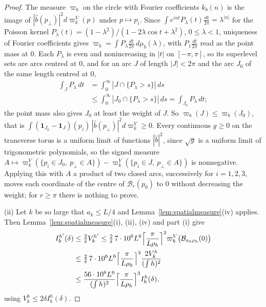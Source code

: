 \documentclass[aps,prd,twocolumn,superscriptaddress,nofootinbib,longbibliography,floatfix,amsmath,amssymb,10pt]{revtex4-2}
\theoremstyle{definition}
\theoremstyle{remark}
\begin{document}
\begin{proof}
The measure $\varpi_b$ on the circle with Fourier coefficients $k_b(n)$ is
the image of $|\hat b(p_\perp)|^2d\varpi^V_k(p)$ under $p\mapsto p_i$.
Since $\int e^{int}P_\lambda(t)\frac{dt}{2\pi}=\lambda^{|n|}$ for the Poisson
kernel $P_\lambda(t)=(1-\lambda^2)/(1-2\lambda\cos t+\lambda^2)$, $0\le
\lambda<1$, uniqueness of Fourier coefficients gives $\varpi_b=\int
P_\lambda\frac{dt}{2\pi}\,d\mu_b(\lambda)$, with $P_1\frac{dt}{2\pi}$ read
as the point mass at $0$. Each $P_\lambda$ is even and nonincreasing in
$|t|$ on $[-\pi,\pi]$, so its superlevel sets are arcs centred at $0$, and
for an arc $J$ of length $|J|<2\pi$ and the arc $J_0$ of the same length
centred at $0$,
\[
\begin{split}
\int_JP_\lambda\,dt&=\int_0^\infty|J\cap\{P_\lambda>s\}|\,ds\\
&\le\int_0^\infty|J_0\cap\{P_\lambda>s\}|\,ds=\int_{J_0}P_\lambda\,dt ;
\end{split}
\]
the point mass also gives $J_0$ at least the weight of $J$. So
$\varpi_b(J)\le\varpi_b(J_0)$, that is $\int(\mathbf 1_{J_0}-\mathbf 1_J)
(p_i)\,|\hat b(p_\perp)|^2d\varpi^V_k\ge0$. Every continuous $g\ge0$ on
the transverse torus is a uniform limit of functions $|\hat b|^2$, since
$\sqrt g$ is a uniform limit of trigonometric polynomials, so the signed
measure $A\mapsto\varpi^V_k(\{p_i\in J_0,\ p_\perp\in A\})-\varpi^V_k(\{p_i
\in J,\ p_\perp\in A\})$ is nonnegative. Applying this with $A$ a product of
two closed arcs, successively for $i=1,2,3$, moves each coordinate of the
centre of $\mathcal B_r(p_0)$ to $0$ without decreasing the weight; for
$r\ge\pi$ there is nothing to prove.

(ii) Let $k$ be so large that $a_k\le L/4$ and
Lemma~\ref{lem:spatialmeasure}(iv) applies. Then
Lemma~\ref{lem:spatialmeasure}(i), (ii), (iv) and part (i) give
\[
\begin{split}
I^{h'}_k(\delta)&\le\tfrac2\delta V^{h'}_k\le\tfrac2\delta\,7\cdot10^6L^6
\Bigl\lceil\frac\pi{L\rho_h}\Bigr\rceil^3\varpi^V_k\bigl(\mathcal
B_{a_k\rho_h}(0)\bigr)\\
&\le\tfrac2\delta\,7\cdot10^6L^6\Bigl\lceil\frac\pi{L\rho_h}\Bigr\rceil^3
\frac{2V^h_k}{(\int h)^2}\\
&\le\frac{56\cdot10^6L^6}{(\int h)^2}\Bigl\lceil
\frac\pi{L\rho_h}\Bigr\rceil^3I^h_k(\delta),
\end{split}
\]
using $V^h_k\le2\delta I^h_k(\delta)$.
\end{proof}
\end{document}
